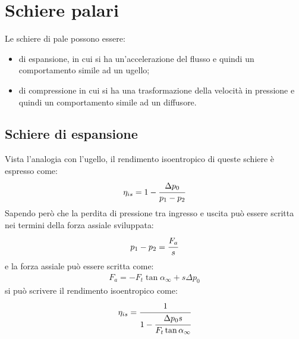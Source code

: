 \section{Schiere palari}
Le schiere di pale possono essere:
\begin{itemize}
	\item di espansione, in cui si ha un'accelerazione del flusso e quindi un comportamento simile ad un ugello;
	\item  di compressione in cui si ha una trasformazione della velocità in pressione e quindi un comportamento simile ad un diffusore. 
\end{itemize}
\subsection{Schiere di espansione}
Vista l'analogia con l'ugello, il rendimento isoentropico di queste schiere è espresso come:
\begin{align*}
\eta_{is} = 1- \cfrac{\Delta p_0}{p_1 - p_2}
\end{align*}
Sapendo però che la perdita di pressione tra ingresso e uscita può essere scritta nei termini della forza assiale sviluppata:
\begin{align*}
p_1-p_2 = \cfrac{F_a}{s}
\end{align*}
e la forza assiale può essere scritta come:
\begin{align*}
F_a=  - F_t \tan \alpha_{\infty} + s \Delta p_0
\end{align*}
si può scrivere il rendimento isoentropico come:
\begin{align*}
\eta_{is} = \cfrac{1}{1- \cfrac{\Delta p_0 s}{F_t \tan \alpha_{\infty}}}
\end{align*}
